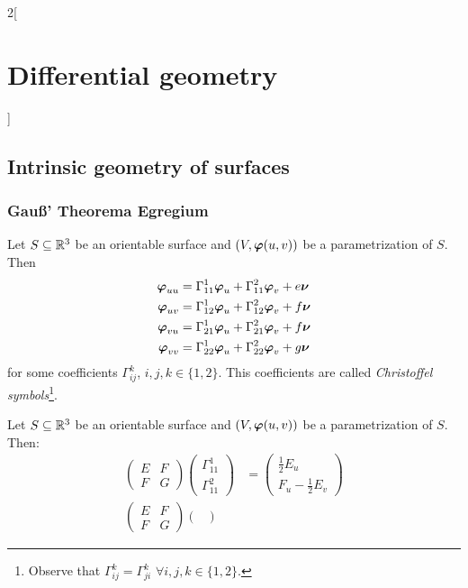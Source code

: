 \documentclass[../../../main_math.tex]{subfiles}
\begin{document}
\begin{multicols}{2}[\section{Differential geometry}]
  \subsection{Intrinsic geometry of surfaces}
  \subsubsection{Gau\ss' Theorema Egregium}
  \begin{definition}
    Let $S\subseteq\mathbb{R}^3$ be an orientable surface and $(V,\boldsymbol{\mathrm{\varphi}}(u,v))$ be a parametrization of $S$. Then
    \begin{align*}
      \boldsymbol{\mathrm{\varphi}}_{uu} & =\Gamma_{11}^1\boldsymbol{\mathrm{\varphi}}_u+\Gamma_{11}^2\boldsymbol{\mathrm{\varphi}}_v+e\boldsymbol{\mathrm{\nu}} \\
      \boldsymbol{\mathrm{\varphi}}_{uv} & =\Gamma_{12}^1\boldsymbol{\mathrm{\varphi}}_u+\Gamma_{12}^2\boldsymbol{\mathrm{\varphi}}_v+f\boldsymbol{\mathrm{\nu}} \\
      \boldsymbol{\mathrm{\varphi}}_{vu} & =\Gamma_{21}^1\boldsymbol{\mathrm{\varphi}}_u+\Gamma_{21}^2\boldsymbol{\mathrm{\varphi}}_v+f\boldsymbol{\mathrm{\nu}} \\
      \boldsymbol{\mathrm{\varphi}}_{vv} & =\Gamma_{22}^1\boldsymbol{\mathrm{\varphi}}_u+\Gamma_{22}^2\boldsymbol{\mathrm{\varphi}}_v+g\boldsymbol{\mathrm{\nu}}
    \end{align*}
    for some coefficients $\Gamma_{ij}^k$, $i,j,k\in\{1,2\}$. This coefficients are called \emph{Christoffel symbols}\footnote{Observe that $\Gamma_{ij}^k=\Gamma_{ji}^k$  $\forall i,j,k\in\{1,2\}$.}.
  \end{definition}
  \begin{proposition}
    Let $S\subseteq\mathbb{R}^3$ be an orientable surface and $(V,\boldsymbol{\mathrm{\varphi}}(u,v))$ be a parametrization of $S$. Then:
    \begin{align*}
      \begin{pmatrix}
        E & F \\
        F & G
      \end{pmatrix}
      \begin{pmatrix}
        \Gamma_{11}^1 \\
        \Gamma_{11}^2
      \end{pmatrix} & =\begin{pmatrix}
                         \frac{1}{2}E_u \\
                         F_u-\frac{1}{2}E_v
                       \end{pmatrix}  \\
      \begin{pmatrix}
        E & F \\
        F & G
      \end{pmatrix}
      \begin{pmatrix}

\end{pmatrix}
\end{align*}
\end{proposition}
\end{multicols}
\end{document}
